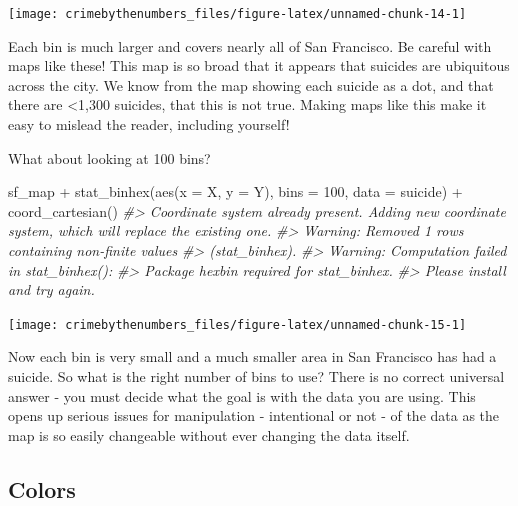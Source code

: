 \documentclass[
  12pt,
  openany]{book}
\newenvironment{Shaded}{\begin{snugshade}}{\end{snugshade}}
\newcommand{\AttributeTok}[1]{\textcolor[rgb]{0.61,0.61,0.61}{#1}}
\newcommand{\CommentTok}[1]{\textcolor[rgb]{0.37,0.37,0.37}{\textit{#1}}}
\newcommand{\DecValTok}[1]{\textcolor[rgb]{0.06,0.06,0.06}{#1}}
\newcommand{\FunctionTok}[1]{\textcolor[rgb]{0,0,0}{#1}}
\newcommand{\NormalTok}[1]{#1}
\newcommand{\SpecialCharTok}[1]{\textcolor[rgb]{0,0,0}{#1}}
\begin{document}
\begin{center}\texttt{[image: crimebythenumbers\_files/figure-latex/unnamed-chunk-14-1]} \end{center}

Each bin is much larger and covers nearly all of San Francisco. Be careful with maps like these! This map is so broad that it appears that suicides are ubiquitous across the city. We know from the map showing each suicide as a dot, and that there are \textless1,300 suicides, that this is not true. Making maps like this make it easy to mislead the reader, including yourself!

What about looking at 100 bins?

\begin{Shaded}
\begin{Highlighting}[]
\NormalTok{sf\_map }\SpecialCharTok{+}
  \FunctionTok{stat\_binhex}\NormalTok{(}\FunctionTok{aes}\NormalTok{(}\AttributeTok{x =}\NormalTok{ X, }\AttributeTok{y =}\NormalTok{ Y),}
              \AttributeTok{bins =} \DecValTok{100}\NormalTok{,}
              \AttributeTok{data =}\NormalTok{ suicide) }\SpecialCharTok{+}
  \FunctionTok{coord\_cartesian}\NormalTok{() }
\CommentTok{\#\textgreater{} Coordinate system already present. Adding new coordinate system, which will replace the existing one.}
\CommentTok{\#\textgreater{} Warning: Removed 1 rows containing non{-}finite values}
\CommentTok{\#\textgreater{} (stat\_binhex).}
\CommentTok{\#\textgreater{} Warning: Computation failed in \textasciigrave{}stat\_binhex()\textasciigrave{}:}
\CommentTok{\#\textgreater{}   Package \textasciigrave{}hexbin\textasciigrave{} required for \textasciigrave{}stat\_binhex\textasciigrave{}.}
\CommentTok{\#\textgreater{}   Please install and try again.}
\end{Highlighting}
\end{Shaded}

\begin{center}\texttt{[image: crimebythenumbers\_files/figure-latex/unnamed-chunk-15-1]} \end{center}

Now each bin is very small and a much smaller area in San Francisco has had a suicide. So what is the right number of bins to use? There is no correct universal answer - you must decide what the goal is with the data you are using. This opens up serious issues for manipulation - intentional or not - of the data as the map is so easily changeable without ever changing the data itself.

\hypertarget{colors}{%
\subsection{Colors}\label{colors}}
\end{document}
